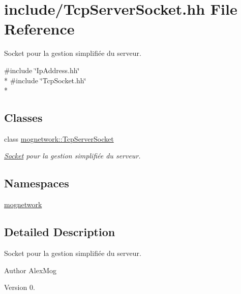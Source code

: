 \hypertarget{_tcp_server_socket_8hh}{\section{include/\-Tcp\-Server\-Socket.hh File Reference}
\label{_tcp_server_socket_8hh}
}


Socket pour la gestion simplifiée du serveur.  


{\ttfamily \#include \char`\"{}Ip\-Address.\-hh\char`\"{}}\\*
{\ttfamily \#include \char`\"{}Tcp\-Socket.\-hh\char`\"{}}\\*
\subsection*{Classes}
\begin{DoxyCompactItemize}
\item 
class \hyperlink{classmognetwork_1_1_tcp_server_socket}{mognetwork\-::\-Tcp\-Server\-Socket}
\begin{DoxyCompactList}\small\item\em \hyperlink{classmognetwork_1_1_socket}{Socket} pour la gestion simplifiée du serveur. \end{DoxyCompactList}\end{DoxyCompactItemize}
\subsection*{Namespaces}
\begin{DoxyCompactItemize}
\item 
\hyperlink{namespacemognetwork}{mognetwork}
\end{DoxyCompactItemize}


\subsection{Detailed Description}
Socket pour la gestion simplifiée du serveur. \begin{DoxyAuthor}{Author}
Alex\-Mog 
\end{DoxyAuthor}
\begin{DoxyVersion}{Version}
0. 
\end{DoxyVersion}
